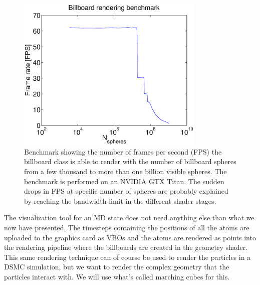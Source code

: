 \begin{figure}[h]
\begin{center}
\includegraphics[width=0.8\textwidth, trim=0cm 0cm 0cm 0cm, clip]{visualization/figures/benchmark.eps}
\end{center}
\caption{Benchmark showing the number of frames per second (FPS) the billboard class is able to render with the number of billboard spheres from a few thousand to more than one billion visible spheres. The benchmark is performed on an NVIDIA GTX Titan. The sudden drops in FPS at specific number of spheres are probably explained by reaching the bandwidth limit in the different shader stages.}
\label{fig:rendering_benchmark}
\end{figure}
The visualization tool for an MD state does not need anything else than what we now have presented. The timesteps containing the positions of all the atoms are uploaded to the graphics card as VBOs and the atoms are rendered as points into the rendering pipeline where the billboards are created in the geometry shader. This same rendering technique can of course be used to render the particles in a DSMC simulation, but we want to render the complex geometry that the particles interact with. We will use what's called marching cubes for this.
